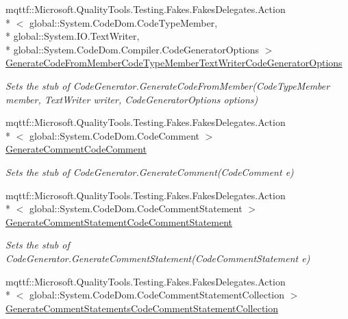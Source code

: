 \begin{DoxyCompactItemize}
mqttf\-::\-Microsoft.\-Quality\-Tools.\-Testing.\-Fakes.\-Fakes\-Delegates.\-Action\\*
$<$ global\-::\-System.\-Code\-Dom.\-Code\-Type\-Member, \\*
global\-::\-System.\-I\-O.\-Text\-Writer, \\*
global\-::\-System.\-Code\-Dom.\-Compiler.\-Code\-Generator\-Options $>$ \hyperlink{class_system_1_1_code_dom_1_1_compiler_1_1_fakes_1_1_stub_code_compiler_a2bfd4f292e5b93b85deb404c5826a60c}{Generate\-Code\-From\-Member\-Code\-Type\-Member\-Text\-Writer\-Code\-Generator\-Options}
\begin{DoxyCompactList}\small\item\em Sets the stub of Code\-Generator.\-Generate\-Code\-From\-Member(\-Code\-Type\-Member member, Text\-Writer writer, Code\-Generator\-Options options)\end{DoxyCompactList}\item 
mqttf\-::\-Microsoft.\-Quality\-Tools.\-Testing.\-Fakes.\-Fakes\-Delegates.\-Action\\*
$<$ global\-::\-System.\-Code\-Dom.\-Code\-Comment $>$ \hyperlink{class_system_1_1_code_dom_1_1_compiler_1_1_fakes_1_1_stub_code_compiler_a6d5a154c6b271bd345946f17b196b47d}{Generate\-Comment\-Code\-Comment}
\begin{DoxyCompactList}\small\item\em Sets the stub of Code\-Generator.\-Generate\-Comment(\-Code\-Comment e)\end{DoxyCompactList}\item 
mqttf\-::\-Microsoft.\-Quality\-Tools.\-Testing.\-Fakes.\-Fakes\-Delegates.\-Action\\*
$<$ global\-::\-System.\-Code\-Dom.\-Code\-Comment\-Statement $>$ \hyperlink{class_system_1_1_code_dom_1_1_compiler_1_1_fakes_1_1_stub_code_compiler_aa355652e06ea4d89d7c02bc4ab443ddb}{Generate\-Comment\-Statement\-Code\-Comment\-Statement}
\begin{DoxyCompactList}\small\item\em Sets the stub of Code\-Generator.\-Generate\-Comment\-Statement(\-Code\-Comment\-Statement e)\end{DoxyCompactList}\item 
mqttf\-::\-Microsoft.\-Quality\-Tools.\-Testing.\-Fakes.\-Fakes\-Delegates.\-Action\\*
$<$ global\-::\-System.\-Code\-Dom.\-Code\-Comment\-Statement\-Collection $>$ \hyperlink{class_system_1_1_code_dom_1_1_compiler_1_1_fakes_1_1_stub_code_compiler_a59fd534b4deda1be10f403f8410f2132}{Generate\-Comment\-Statements\-Code\-Comment\-Statement\-Collection}

\end{DoxyCompactItemize}
